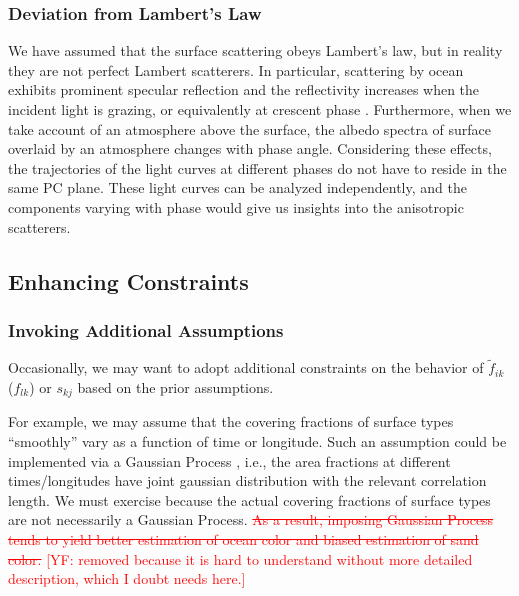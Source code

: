 \documentclass[iop,numberedappendix,apj]{emulateapj}
\def\fast{\tilde f}
\def\edit#1{\textcolor{red}{#1}}
\begin{document}
\subsubsection{Deviation from Lambert's Law}
\label{ss:deviate_Lambert}

We have assumed that the surface scattering obeys Lambert's law, but in reality they are not perfect Lambert scatterers. 
In particular, scattering by ocean exhibits prominent specular reflection and the reflectivity increases when the incident light is grazing, or equivalently at crescent phase \citep[e.g.,][]{Williams2008,Robinson2010,Robinson2014}. 
Furthermore, when we take account of an atmosphere above the surface, the albedo spectra of surface overlaid by an atmosphere changes with phase angle.  
Considering these effects, the trajectories of the light curves at different phases do not have to reside in the same PC plane. 
These light curves can be analyzed independently, and the components varying with phase would give us insights into the anisotropic scatterers. 




\subsection{Enhancing Constraints}
\label{ss:enhancing_constraints}

\subsubsection{Invoking Additional Assumptions}

Occasionally, we may want to adopt additional constraints on the behavior of $\fast _{ik}$ ($f_{lk}$) or $s_{kj}$ based on the prior assumptions. 

For example, we may assume that the covering fractions of surface types  ``smoothly'' vary as a function of time or longitude. 
Such an assumption could be implemented via a Gaussian Process \citep[e.g.,][]{Rasmussen2005}, i.e., the area fractions at different times/longitudes have joint gaussian distribution with the relevant correlation length. 
We must exercise because the actual covering fractions of surface types are not necessarily a Gaussian Process. 
\edit{\sout{As a result, imposing Gaussian Process tends to yield better estimation of ocean color and biased estimation of \edit{sand} color. }[YF: removed because it is hard to understand without more detailed description, which I doubt needs here.]}
\end{document}
